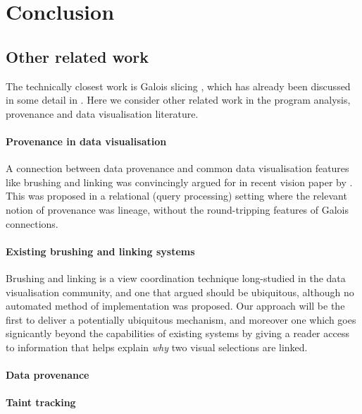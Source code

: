 \section{Conclusion}
\label{sec:conclusion}

\subsection{Other related work}
\label{sec:conclusion:other-related-work}

The technically closest work is Galois slicing \cite{perera12a,ricciotti17,perera16d}, which has already been discussed in some detail in . Here we consider other related work in the program analysis, provenance and data visualisation literature.

\paragraph{Provenance in data visualisation}

A connection between data provenance and common data visualisation features like brushing and linking was convincingly argued for in recent vision paper by \citet{psallidas18}. This was proposed in a relational (query processing) setting where the relevant notion of provenance was lineage, without the round-tripping features of Galois connections.

\paragraph{Existing brushing and linking systems}

Brushing and linking is a view coordination technique long-studied in the data visualisation community, and one that \citet{roberts06} argued should be ubiquitous, although no automated method of implementation was proposed. Our approach will be the first to deliver a potentially ubiquitous mechanism, and moreover one which goes signicantly beyond the capabilities of existing systems by giving a reader access to information that helps explain \emph{why} two visual selections are linked.

\paragraph{Data provenance}

\paragraph{Taint tracking}


